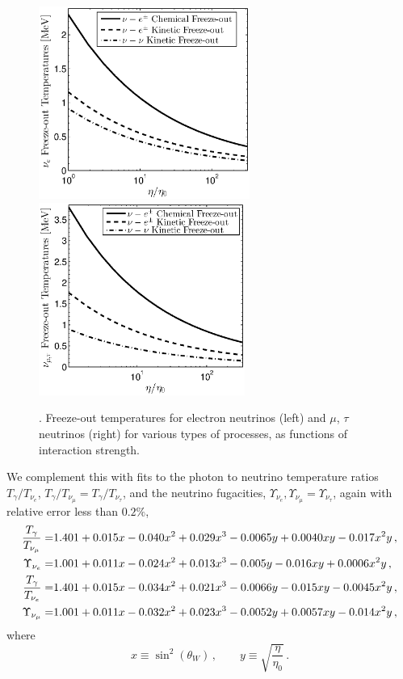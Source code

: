 \begin{figure}[ht]
\centerline{\includegraphics[height=6.3cm]{04-birrell/ParametricStudies/Figures/nu_e_freezeout_GF.eps}\hspace{5mm}\includegraphics[height=6.3cm]{04-birrell/ParametricStudies/Figures/nu_mu_freezeout_GF.eps}}
\caption{. Freeze-out temperatures for electron neutrinos (left) and $\mu$, $\tau$ neutrinos (right) for various types of processes, as functions of interaction strength.}\label{fig:freezeoutT_eta}
 \end{figure}



We complement this with fits to the photon to neutrino temperature ratios $ T_\gamma / T_{\nu_e}$, $T_\gamma / T_{\nu_\mu}= T_\gamma / T_{\nu_\tau} $, and the neutrino fugacities, $\Upsilon_{\nu_e}, \Upsilon_{\nu_\mu}=\Upsilon_{\nu_\tau}$, again with relative error less than $0.2\%$,  
\begin{align}
\frac{T_\gamma}{T_{\nu_\mu}}=&1.401+0.015x-0.040x^2+0.029x^3-0.0065y+0.0040xy-0.017x^2y\,, \notag\\
\Upsilon_{\nu_e}=&1.001+0.011x-0.024x^2+0.013x^3-0.005y-0.016xy+0.0006x^2y\,,\notag\\ 
\frac{T_\gamma}{T_{\nu_e}}=&1.401+0.015x-0.034x^2+0.021x^3-0.0066y-0.015xy-0.0045x^2y\,,\notag\\
\Upsilon_{\nu_\mu}=&1.001+0.011x-0.032x^2+0.023x^3-0.0052y+0.0057xy-0.014x^2y\,,
\end{align}
where
\begin{equation}%
x\equiv \sin^2(\theta_W)\, ,\qquad
y\equiv  \sqrt{\frac{\eta}{\eta_0}}\,.
\end{equation}%

